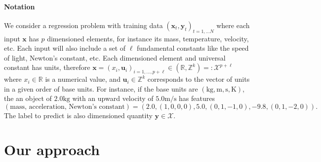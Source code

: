 \documentclass[nohyperref]{article}
\theoremstyle{plain}
\theoremstyle{definition}
\theoremstyle{remark}
\newcommand{\unit}[1]{\mathrm{#1}}
\newcommand{\kg}{\unit{kg}}
\newcommand{\m}{\unit{m}}
\newcommand{\s}{\unit{s}}
\newcommand{\K}{\unit{K}}
\begin{document}
\paragraph{Notation} 
We consider a regression problem with training data $(\mathbf x_t, \mathbf y_t)_{t=1,\ldots N}$ where each input $\mathbf x$ has $p$ dimensioned elements, for instance its mass, temperature, velocity, etc. Each input will also include a set of $\ell$ fundamental constants like the speed of light, Newton's constant, etc. Each dimensioned element and universal constant has units, therefore  $\mathbf x = (x_i, \mathbf u_i )_{i=1,\ldots, p+\ell} \in (\mathbb R, \mathbb Z^k) =: \mathcal X^{p+\ell}$ where $x_i \in \mathbb R$ is a numerical value, and $\mathbf u_i \in \mathbb Z^k$ corresponds to the vector of units in a given order of base units. For instance, if the base units are $(\kg, \m, \s, \K)$, the an object of $2.0 \kg$ with an upward velocity of $5.0 \m/\s$ has features $(\text{mass, acceleration, Newton's constant})=(2.0, (1,0,0,0), 5.0, (0, 1, -1, 0) ,-9.8, (0, 1, -2, 0)).$ The label to predict is also dimensioned quantity $\mathbf y \in \mathcal X$.


\section{Our approach}


\end{document}
